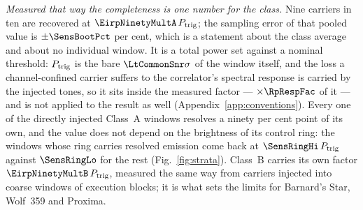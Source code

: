 \emph{Measured that way the completeness is one number for the class.} Nine
carriers in ten are recovered at $\EirpNinetyMultA\,P_{\rm trig}$; the sampling
error of that pooled value is $\pm\SensBootPct$ per cent, which is a statement
about the class average and about no individual window. It is a total power
set against a nominal threshold: $P_{\rm trig}$ is the bare
$\LtCommonSnr\sigma$ of the window itself, and the loss a channel-confined
carrier suffers to the correlator's spectral response is carried by the
injected tones, so it sits inside the measured factor --- $\times\RpRespFac$
of it --- and is not applied to the result as well
(Appendix~\ref{app:conventions}). Every one of the
\SensNInj{} directly injected Class~A windows resolves a ninety per cent point
of its own, and the value does not depend on the brightness of its control
ring: the \SensNRingHi{} windows whose ring carries resolved emission come
back at $\SensRingHi\,P_{\rm trig}$ against $\SensRingLo$ for the rest
(Fig.~\ref{fig:strata}). Class~B carries
its own factor $\EirpNinetyMultB\,P_{\rm trig}$, measured the same way from
\SensNToneCoarse{} carriers injected into \SensNInjCoarse{} coarse windows of
\SensNInjCoarseBlock{} execution blocks; it is what sets the limits for
Barnard's Star, Wolf~359 and Proxima.

